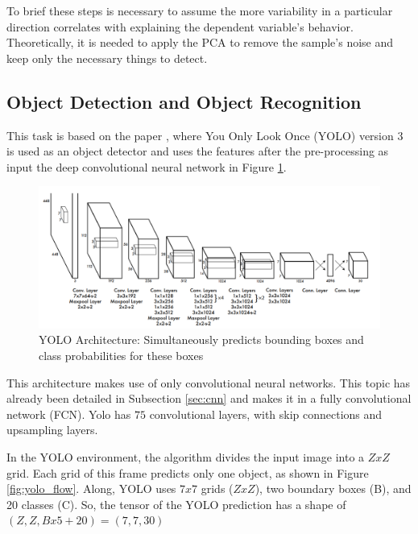 To brief these steps is necessary to assume the more variability in a particular direction correlates with explaining the dependent variable's behavior. Theoretically, it is needed to apply the PCA to remove the sample's noise and keep only the necessary things to detect.


\subsection{Object Detection and Object Recognition} 

This task is based on the paper \cite{redmon2016you}, where You Only Look Once (YOLO) version 3 is used as an object detector and uses the features after the pre-processing as input the deep convolutional neural network in Figure \ref{fig:yolo_arc}.  

\begin{figure}[H]
\centering
\includegraphics[width=\textwidth]{imagens/yolo.png}
\caption{YOLO Architecture: Simultaneously predicts bounding boxes and class probabilities for these boxes \cite{redmon2016you}}
\label{fig:yolo_arc}
\end{figure}

This architecture makes use of only convolutional neural networks. This topic has already been detailed in Subsection \ref{sec:cnn} and makes it in a fully convolutional network (FCN). Yolo has $75$ convolutional layers, with skip connections and upsampling layers.  





In the YOLO environment, the algorithm divides the input image into a $ZxZ$ grid. Each grid of this frame predicts only one object, as shown in Figure \ref{fig:yolo_flow}. Along, YOLO uses $7x7$ grids ($ZxZ$), two boundary boxes (B), and 20 classes (C). So, the tensor of the YOLO prediction has a shape of $(Z, Z, Bx5+20) = (7,7,30)$


